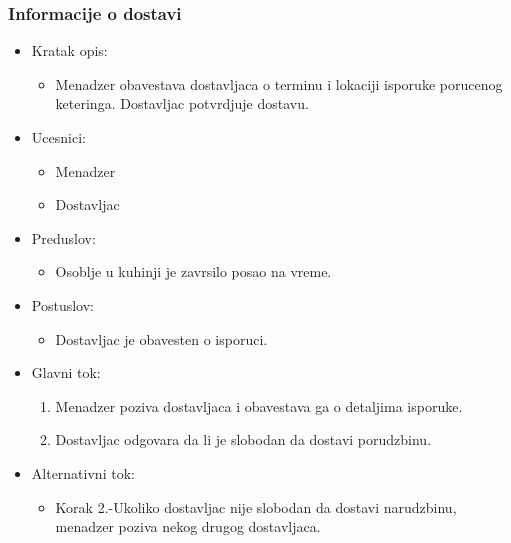 \documentclass[a4paper]{article}
\begin{document}
\subsubsection{Informacije o dostavi}
\begin{itemize}
    \item Kratak opis:
    \begin{itemize}
        \item Menadzer obavestava dostavljaca o terminu i lokaciji isporuke porucenog keteringa. Dostavljac potvrdjuje dostavu.
    \end{itemize}
\end{itemize}
  \begin{itemize}
        \item Ucesnici:
          \begin{itemize}
        \item Menadzer
    \end{itemize}
      \begin{itemize}
        \item Dostavljac
    \end{itemize}
    \end{itemize}
      \begin{itemize}
        \item Preduslov:
          \begin{itemize}
        \item Osoblje u kuhinji je zavrsilo posao na vreme.
        
   \end{itemize}
    
    \end{itemize}
      \begin{itemize}
        \item Postuslov:
          \begin{itemize}
        \item Dostavljac je obavesten o isporuci.
    \end{itemize}
    \end{itemize}
      \begin{itemize}
        \item Glavni tok:
          \begin{enumerate}
              \item Menadzer poziva dostavljaca i obavestava ga o detaljima isporuke.
          
              \item Dostavljac odgovara da li je slobodan da dostavi porudzbinu.
          \end{enumerate}
    \end{itemize}
      \begin{itemize}
        \item Alternativni tok:
          \begin{itemize}
        \item Korak 2.-Ukoliko dostavljac nije slobodan da dostavi narudzbinu, menadzer poziva nekog drugog dostavljaca.
    \end{itemize}
    \end{itemize}
    
\end{document}

